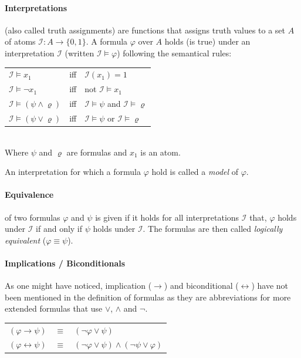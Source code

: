 \paragraph{Interpretations} (also called truth assignments) are functions that assigns truth values to a set $A$ of atoms $\mathcal{I}: A \rightarrow \{0,1\}$. A formula $\varphi$ over $A$ holds (is true) under an interpretation $\mathcal{I}$ (written $\mathcal{I} \models \varphi$) following the semantical rules:
\begin{center}
    \begin{tabular}{ l l l }
    $\mathcal{I} \models x_1$ & iff & $\mathcal{I}(x_1) = 1$\\
    $\mathcal{I} \models \neg x_1$ & iff & not $\mathcal{I} \models x_1$\\
    $\mathcal{I} \models (\psi \land \varrho)$ & iff & $\mathcal{I} \models \psi$ and $\mathcal{I} \models \varrho$\\
    $\mathcal{I} \models (\psi \lor \varrho)$ & iff & $\mathcal{I} \models \psi$ or $\mathcal{I} \models \varrho$\\
\end{tabular}\\
Where $\psi$ and  $\varrho$ are formulas and $x_1$ is an atom.
\end{center}An interpretation for which a formula $\varphi$ hold is called a \emph{model} of $\varphi$.

\paragraph{Equivalence}
of two formulas $\varphi$ and $\psi$ is given if it holds for all interpretations $\mathcal{I}$ that, $\varphi$ holds under $\mathcal{I}$ if and only if $\psi$ holds under $\mathcal{I}$. The formulas are then called \emph {logically equivalent} ($\varphi \equiv \psi$).

\paragraph{Implications / Biconditionals}
As one might have noticed, implication ($\rightarrow$) and biconditional ($\leftrightarrow$) have not been mentioned in the definition of formulas as they are abbreviations for more extended formulas that use $\lor$, $\land$ and $\neg$.
\begin{center}
\begin{tabular}{ l l l }
    $(\varphi \rightarrow \psi)$ & $\equiv$ & $(\neg\varphi \lor \psi)$\\
    $(\varphi \leftrightarrow \psi)$ & $\equiv$ & $(\neg\varphi \lor \psi) \land (\neg\psi \lor \varphi)$\\
\end{tabular}
\end{center}

